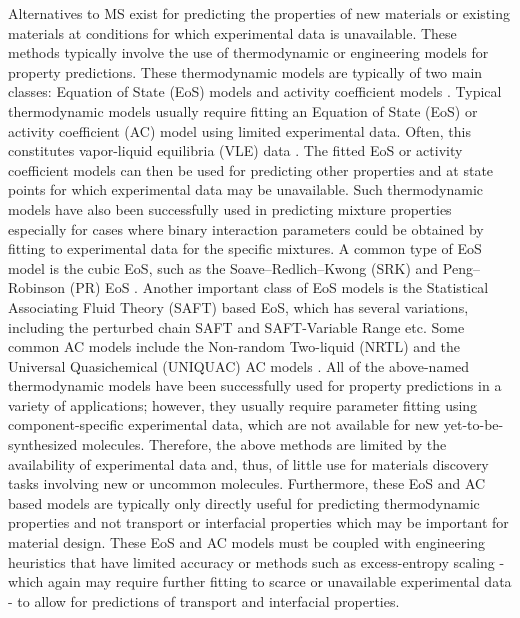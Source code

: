 \documentclass[journal=jacsat,manuscript=article]{achemso}
\begin{document}
Alternatives to MS exist for predicting the properties of new materials or existing materials at conditions for which experimental data is unavailable. 
These methods typically involve the use of thermodynamic or engineering models for property predictions. 
These thermodynamic models are typically of two main classes: Equation of State (EoS) models and activity coefficient models \cite{Kontogeorgis2009}. 
Typical thermodynamic models usually require fitting an Equation of State (EoS)  or activity coefficient (AC) model using limited experimental data. Often, this constitutes vapor-liquid equilibria (VLE) data \cite{Kontogeorgis2009}. 
The fitted EoS or activity coefficient models can then be used for predicting other properties and at state points for which experimental data may be unavailable. 
Such thermodynamic models have also been successfully used in predicting mixture properties \cite{leeThermodynamicPropertyPredictions1992, fedaliModelingThermodynamicProperties2014, nasrifarPredictionThermodynamicProperties2006}  especially for cases where binary interaction parameters could be obtained by fitting to experimental data for the specific mixtures. 
A common type of EoS model is the cubic EoS, such as the Soave–Redlich–Kwong (SRK) and Peng–Robinson (PR) EoS \cite{Kontogeorgis2009}. 
Another important class of EoS models is the Statistical Associating Fluid Theory (SAFT) based EoS, which has several variations, including the perturbed chain SAFT \cite{almasiEvaluationThermodynamicProperties2014, tumakakaThermodynamicModelingComplex2005} and SAFT-Variable Range \cite{lafitteComprehensiveDescriptionChemical2007, mccabeSAFTVRModellingPhase1999, pereiraIntegratedSolventProcess2011} etc.
Some common AC models include the Non-random Two-liquid (NRTL) and the Universal Quasichemical (UNIQUAC) AC models \cite{Kontogeorgis2009}. 
All of the above-named thermodynamic models have been successfully used for property predictions in a variety of applications; however, they usually require parameter fitting using component-specific experimental data, which are not available for new yet-to-be-synthesized molecules. 
Therefore, the above methods are limited by the availability of experimental data and, thus, of little use for materials discovery tasks involving new or uncommon molecules. 
Furthermore, these EoS and AC based models are typically only directly useful for predicting thermodynamic properties and not transport or interfacial properties which may be important for material design. 
These EoS and AC models must be coupled with engineering heuristics that have limited accuracy or methods such as excess-entropy scaling \cite{dehlouzEntropyScalingBasedCorrelation2022, dyrePerspectiveExcessentropyScaling2018} - which again may require further fitting to scarce or unavailable experimental data - to allow for predictions of transport and interfacial properties. 
\end{document}
